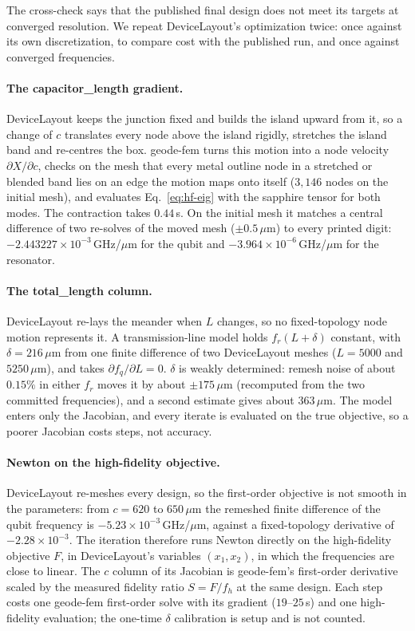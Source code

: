 \documentclass{anvil-paper}
\begin{document}
The cross-check says that the published final design does not meet its
targets at converged resolution. We repeat DeviceLayout's optimization
twice: once against its own discretization, to compare cost with the
published run, and once against converged frequencies.

\paragraph{The capacitor\_length gradient.}
DeviceLayout keeps the junction fixed and builds the island upward from
it, so a change of $c$ translates every node above the island rigidly,
stretches the island band and re-centres the box. geode-fem turns this
motion into a node velocity $\partial X/\partial c$, checks on the mesh
that every metal outline node in a stretched or blended band lies on an
edge the motion maps onto itself ($3{,}146$ nodes on the initial mesh),
and evaluates Eq.~\eqref{eq:hf-eig} with the sapphire tensor for both
modes. The contraction takes $0.44$\,s. On the initial mesh it matches a
central difference of two re-solves of the moved mesh ($\pm0.5\,\mu$m) to
every printed digit: $-2.443227\times10^{-3}$\,GHz/$\mu$m for the qubit
and $-3.964\times10^{-6}$\,GHz/$\mu$m for the resonator.

\paragraph{The total\_length column.}
DeviceLayout re-lays the meander when $L$ changes, so no fixed-topology
node motion represents it. A transmission-line model holds
$f_r(L+\delta)$ constant, with $\delta = 216\,\mu$m from one finite
difference of two DeviceLayout meshes ($L = 5000$ and $5250\,\mu$m), and
takes $\partial f_q/\partial L = 0$. $\delta$ is weakly determined:
remesh noise of about $0.15\%$ in either $f_r$ moves it by about
$\pm175\,\mu$m (recomputed from the two committed frequencies), and a
second estimate gives about $363\,\mu$m. The model enters
only the Jacobian, and every iterate is evaluated on the true objective,
so a poorer Jacobian costs steps, not accuracy.

\paragraph{Newton on the high-fidelity objective.}
DeviceLayout re-meshes every design, so the first-order objective is not
smooth in the parameters: from $c = 620$ to $650\,\mu$m the remeshed finite
difference of the qubit frequency is $-5.23\times10^{-3}$\,GHz/$\mu$m,
against a fixed-topology derivative of $-2.28\times10^{-3}$. The iteration
therefore runs Newton directly on the high-fidelity objective $F$, in
DeviceLayout's variables $(x_1, x_2)$, in which the frequencies are close
to linear. The $c$ column of its Jacobian is geode-fem's first-order
derivative scaled by the measured fidelity ratio $S = F/f_h$ at the same
design. Each step costs one geode-fem first-order solve with its
gradient ($19$--$25$\,s) and one high-fidelity evaluation; the one-time
$\delta$ calibration is setup and is not counted.
\end{document}
